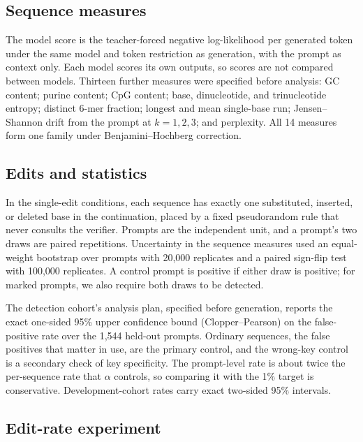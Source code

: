 \documentclass[10pt,twocolumn]{article}
\begin{document}
\subsection{Sequence measures}

The model score is the teacher-forced negative log-likelihood per generated token under the same
model and token restriction as generation, with the prompt as context only. Each model scores its
own outputs, so scores are not compared between models. Thirteen further measures were specified
before analysis: GC content; purine content; CpG content; base, dinucleotide, and trinucleotide
entropy; distinct 6-mer fraction; longest and mean single-base run; Jensen--Shannon drift from the
prompt at $k = 1, 2, 3$; and perplexity. All 14 measures form one family under
Benjamini--Hochberg correction.

\subsection{Edits and statistics}

In the single-edit conditions, each sequence has exactly one substituted, inserted, or deleted base in
the continuation, placed by a fixed pseudorandom rule that never consults the verifier. Prompts are
the independent unit, and a prompt's two draws are paired repetitions. Uncertainty in the sequence
measures used an equal-weight bootstrap over prompts with 20{,}000 replicates and a paired
sign-flip test with 100{,}000 replicates. A control prompt is positive if either draw is positive;
for marked prompts, we also require both draws to be detected.

The detection cohort's analysis plan, specified before generation, reports the exact one-sided
95\% upper confidence bound (Clopper--Pearson) on the false-positive rate over the 1{,}544
held-out prompts. Ordinary sequences, the false positives that matter in use, are the primary control,
and the wrong-key control is a secondary check of key specificity. The prompt-level rate is about
twice the per-sequence rate that $\alpha$ controls, so comparing it with the 1\% target is
conservative. Development-cohort rates carry exact two-sided 95\% intervals.

\subsection{Edit-rate experiment}
\label{sec:edit-rate-methods}
\end{document}
